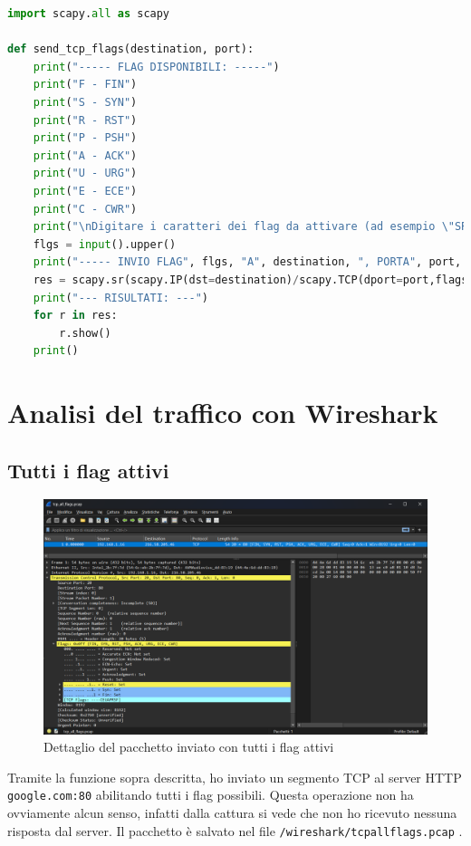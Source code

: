 \documentclass[12pt,a4paper]{report}
\begin{document}
\begin{lstlisting}[language=Python, caption={Funzione python per la generazione di un segmento \texttt{TCP} con flag attivabili a scelta}, label={code:tcp_flags}]
import scapy.all as scapy

def send_tcp_flags(destination, port):
    print("----- FLAG DISPONIBILI: -----")
    print("F - FIN")
    print("S - SYN")
    print("R - RST")
    print("P - PSH")
    print("A - ACK")
    print("U - URG")
    print("E - ECE")
    print("C - CWR")
    print("\nDigitare i caratteri dei flag da attivare (ad esempio \"SR\" per i flag SYN e RST)\n>", end=" ")
    flgs = input().upper()
    print("----- INVIO FLAG", flgs, "A", destination, ", PORTA", port, "-----")
    res = scapy.sr(scapy.IP(dst=destination)/scapy.TCP(dport=port,flags=flgs), timeout=4)
    print("--- RISULTATI: ---")
    for r in res:
        r.show()
    print()
\end{lstlisting}

\section{Analisi del traffico con Wireshark}

\subsection{Tutti i flag attivi}
\begin{figure}[H]
	\centering
	\includegraphics[width=1\textwidth]{tcp_all_flags}
 	\caption{Dettaglio del pacchetto inviato con tutti i flag attivi}
	\label{tcp_all_flags}
\end{figure}
Tramite la funzione sopra descritta, ho inviato un segmento TCP al server HTTP \texttt{google.com:80} abilitando tutti i flag possibili.
Questa operazione non ha ovviamente alcun senso, infatti dalla cattura si vede che non ho ricevuto nessuna risposta dal server. 
Il pacchetto è salvato nel file \texttt{/wireshark/tcp{\textunderscore}all{\textunderscore}flags.pcap} .
\end{document}
